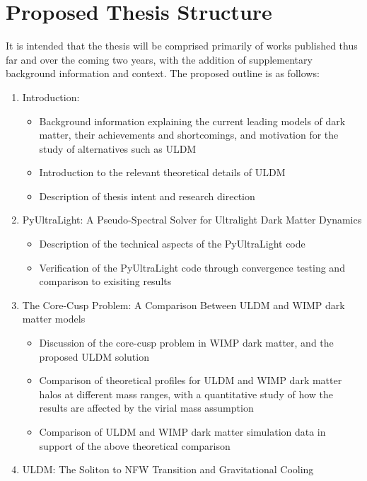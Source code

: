 \section{Proposed Thesis Structure}

It is intended that the thesis will be comprised primarily of works published thus far and over the coming two years, with the addition of supplementary background information and context. The proposed outline is as follows:

\begin{enumerate}
    \item Introduction:
        \begin{itemize}
            \item Background information explaining the current leading models of dark matter, their achievements and shortcomings, and motivation for the study of alternatives such as ULDM
            \item Introduction to the relevant theoretical details of ULDM
            \item Description of thesis intent and research direction
        \end{itemize}
    \item PyUltraLight: A Pseudo-Spectral Solver for Ultralight Dark Matter Dynamics
        \begin{itemize}
            \item Description of the technical aspects of the PyUltraLight code
            \item Verification of the PyUltraLight code through convergence testing and comparison to exisiting results
        \end{itemize}
    \item The Core-Cusp Problem: A Comparison Between ULDM and WIMP dark matter models
        \begin{itemize}
            \item Discussion of the core-cusp problem in WIMP dark matter, and the proposed ULDM solution
            \item Comparison of theoretical profiles for ULDM and WIMP dark matter halos at different mass ranges, with a quantitative study of how the results are affected by the virial mass assumption
            \item Comparison of ULDM and WIMP dark matter simulation data in support of the above theoretical comparison
        \end{itemize}
    \item ULDM: The Soliton to NFW Transition and Gravitational Cooling

\end{enumerate}
